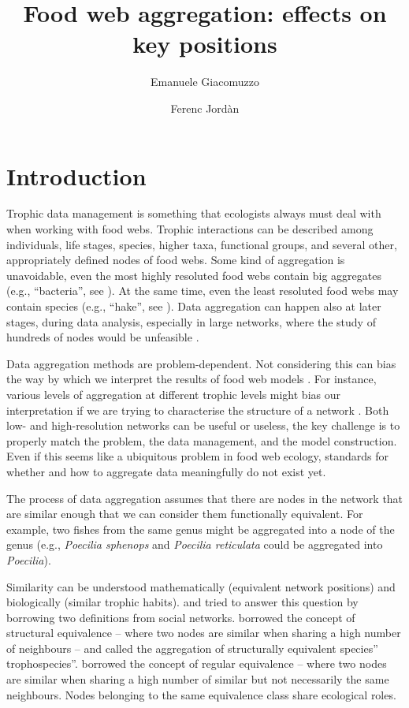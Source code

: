 \documentclass[twocolumn]{article}
\title{Food web aggregation: effects on key positions}
\author[1]{Emanuele Giacomuzzo}
\author[1]{Ferenc Jordàn}
\affil[1]{Stazione Zoologica Anton Dohrn, Napoli, 80122, Italy}
\date{}
\begin{document}
\maketitle
\section*{Introduction}

	Trophic data management is something that ecologists always must deal with when working with food webs. Trophic interactions can be described among individuals, life stages, species, higher taxa, functional groups, and several other, appropriately defined nodes of food webs. Some kind of aggregation is unavoidable, even the most highly resoluted food webs contain big aggregates (e.g., “bacteria'', see \citet{Martinez1991}). At the same time, even the least resoluted food webs may contain species (e.g., “hake”, see \citet{Yodzis1998}). Data aggregation can happen also at later stages, during data analysis, especially in large networks, where the study of hundreds of nodes would be unfeasible \citep{Yodzis1999}.

	Data aggregation methods are problem-dependent. Not considering this can bias the way by which we interpret the results of food web models \citep{Paine1988, Hall1993}. For instance, various levels of aggregation at different trophic levels might bias our interpretation if we are trying to characterise the structure of a network \citep{Yodzis1999}. Both low- and high-resolution networks can be useful or useless, the key challenge is to properly match the problem, the data management, and the model construction. Even if this seems like a ubiquitous problem in food web ecology, standards for whether and how to aggregate data meaningfully do not exist yet.

	The process of data aggregation assumes that there are nodes in the network that are similar enough that we can consider them functionally equivalent.
	For example, two fishes from the same genus might be aggregated into a node of the genus (e.g., \emph{Poecilia sphenops} and \emph{Poecilia reticulata} could be aggregated into \emph{Poecilia}).

	Similarity can be understood mathematically (equivalent network positions) and biologically (similar trophic habits).	\citet{Yodzis1999} and \citet{Luczkovich2003} tried to answer this question by borrowing two definitions from social networks. \citet{Yodzis1999} borrowed the concept of structural equivalence – where two nodes are similar when sharing a high number of neighbours – and called the aggregation of structurally equivalent species” trophospecies”.
	\citet{Luczkovich2003} borrowed the concept of regular equivalence – where two nodes are similar when sharing a high number of similar but not necessarily the same neighbours. Nodes belonging to the same equivalence class share ecological roles.
\end{document}
